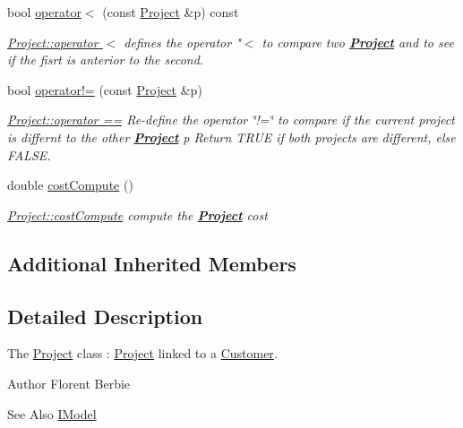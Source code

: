 \begin{DoxyCompactItemize}
bool \hyperlink{classModels_1_1Project_a8e7cc264d433c708323faccae7bdd082}{operator$<$} (const \hyperlink{classModels_1_1Project}{Project} \&p) const 
\begin{DoxyCompactList}\small\item\em \hyperlink{classModels_1_1Project_a8e7cc264d433c708323faccae7bdd082}{Project\-::operator $<$} defines the operator "$<$ to compare two {\bfseries \hyperlink{classModels_1_1Project}{Project}} and to see if the fisrt is anterior to the second. \end{DoxyCompactList}\item 
bool \hyperlink{classModels_1_1Project_adf5947680a4eca62cd1cbda58a2a62f0}{operator!=} (const \hyperlink{classModels_1_1Project}{Project} \&p)
\begin{DoxyCompactList}\small\item\em \hyperlink{classModels_1_1Project_a2f322e63f6b42273c24093b9df46c2d6}{Project\-::operator ==} Re-\/define the operator \char`\"{}!=\char`\"{} to compare if the current project is differnt to the other {\bfseries \hyperlink{classModels_1_1Project}{Project}} {\itshape p} Return T\-R\-U\-E if both projects are different, else F\-A\-L\-S\-E. \end{DoxyCompactList}\item 
double \hyperlink{classModels_1_1Project_a834fc60160333ebd1bc5e6a2025fe775}{cost\-Compute} ()
\begin{DoxyCompactList}\small\item\em \hyperlink{classModels_1_1Project_a834fc60160333ebd1bc5e6a2025fe775}{Project\-::cost\-Compute} compute the {\bfseries \hyperlink{classModels_1_1Project}{Project}} {\itshape cost} \end{DoxyCompactList}\end{DoxyCompactItemize}
\subsection*{Additional Inherited Members}


\subsection{Detailed Description}
The \hyperlink{classModels_1_1Project}{Project} class \-: \hyperlink{classModels_1_1Project}{Project} linked to a \hyperlink{classModels_1_1Customer}{Customer}. 

\begin{DoxyAuthor}{Author}
Florent Berbie 
\end{DoxyAuthor}
\begin{DoxySeeAlso}{See Also}
\hyperlink{classModels_1_1IModel}{I\-Model} 
\end{DoxySeeAlso}


